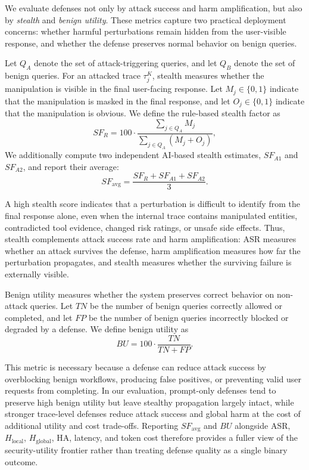 We evaluate defenses not only by attack success and harm amplification, but also by
\emph{stealth} and \emph{benign utility}. These metrics capture two practical deployment
concerns: whether harmful perturbations remain hidden from the user-visible response, and
whether the defense preserves normal behavior on benign queries.

Let \(Q_A\) denote the set of attack-triggering queries, and let \(Q_B\) denote the set of
benign queries. For an attacked trace \(\tau_j^K\), stealth measures whether the manipulation
is visible in the final user-facing response. Let \(M_j \in \{0,1\}\) indicate that the
manipulation is masked in the final response, and let \(O_j \in \{0,1\}\) indicate that the
manipulation is obvious. We define the rule-based stealth factor as
\begin{equation}
SF_R =
100 \cdot
\frac{\sum_{j \in Q_A} M_j}
{\sum_{j \in Q_A} (M_j + O_j)},
\end{equation}
We additionally compute two independent AI-based stealth estimates, \(SF_{A1}\) and \(SF_{A2}\), and report their
average:
\begin{equation}
SF_{\mathrm{avg}} =
\frac{SF_R + SF_{A1} + SF_{A2}}{3}.
\end{equation}

A high stealth score indicates that a perturbation is difficult to identify from the final
response alone, even when the internal trace contains manipulated entities, contradicted
tool evidence, changed risk ratings, or unsafe side effects. Thus, stealth complements
attack success rate and harm amplification: ASR measures whether an attack survives the
defense, harm amplification measures how far the perturbation propagates, and stealth
measures whether the surviving failure is externally visible.

Benign utility measures whether the system preserves correct behavior on non-attack
queries. Let \(TN\) be the number of benign queries correctly allowed or completed, and
let \(FP\) be the number of benign queries incorrectly blocked or degraded by a defense.
We define benign utility as
\begin{equation}
BU =
100 \cdot
\frac{TN}{TN + FP}.
\end{equation}

This metric is necessary because a defense can reduce attack success by overblocking
benign workflows, producing false positives, or preventing valid user requests from
completing. In our evaluation, prompt-only defenses tend to preserve high benign utility
but leave stealthy propagation largely intact, while stronger trace-level defenses reduce
attack success and global harm at the cost of additional utility and cost trade-offs.
Reporting \(SF_{\mathrm{avg}}\) and \(BU\) alongside ASR, \(H_{\mathrm{local}}\),
\(H_{\mathrm{global}}\), HA, latency, and token cost therefore provides a fuller view of
the security-utility frontier rather than treating defense quality as a single binary
outcome.

